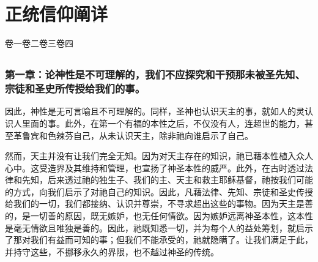 
\chapter{正统信仰阐详}


卷一\newline{}卷二\newline{}卷三\newline{}卷四\par



\section{}


\subsection{第一章：论神性是不可理解的，我们不应探究和干预那未被圣先知、宗徒和圣史所传授给我们的事。}

因此，神性是无可言喻且不可理解的。同样，圣神也认识天主的事，就如人的灵认识人里面的事。此外，在第一个有福的本性之后，不仅没有人，连超世的能力，甚至革鲁宾和色辣芬自己，从未认识天主，除非祂向谁启示了自己。\par

然而，天主并没有让我们完全无知。因为对天主存在的知识，祂已藉本性植入众人心中。这受造界及其维持和管理，也宣扬了神圣本性的威严。此外，在古时透过法律和先知，后来透过祂的独生子、我们的主、天主和救主耶稣基督，祂按我们可能的方式，向我们启示了对祂自己的知识。因此，凡藉法律、先知、宗徒和圣史传授给我们的一切，我们都接纳、认识并尊崇，不寻求超出这些的事物。因为天主是善的，是一切善的原因，既无嫉妒，也无任何情欲。因为嫉妒远离神圣本性，这本性是毫无情欲且唯独是善的。因此，祂既知悉一切，并为每个人的益处筹划，就启示了那对我们有益而可知的事；但我们不能承受的，祂就隐瞒了。让我们满足于此，并持守这些，不挪移永久的界限，也不越过神圣的传统。\par

